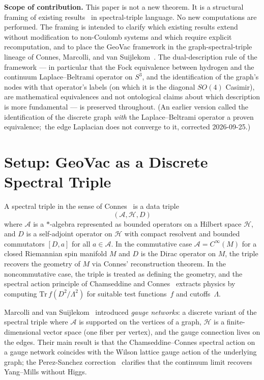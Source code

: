 \documentclass[twocolumn,pra,amsmath,amssymb,superscriptaddress]{revtex4-2}
\begin{document}
\medskip\noindent\textbf{Scope of contribution.}  This paper is not a
new theorem.  It is a structural framing of existing
results~\cite{paper22,paper23,paper24,paper30} in spectral-triple
language.  No new computations are performed.  The framing is
intended to clarify which existing results extend without
modification to non-Coulomb systems and which require explicit
recomputation, and to place the GeoVac framework in the
graph-spectral-triple lineage of Connes, Marcolli, and van
Suijlekom~\cite{connes_book1994,marcolli_vs2014,perez_sanchez2024}.
The dual-description rule of the framework --- in particular that the
Fock equivalence between hydrogen and the continuum Laplace--Beltrami
operator on $S^3$, and the identification of the graph's nodes with
that operator's labels (on which it is the diagonal $SO(4)$ Casimir),
are mathematical equivalences and not ontological claims about which
description is more fundamental --- is preserved throughout.  (An
earlier version called the identification of the discrete graph
\emph{with} the Laplace--Beltrami operator a proven equivalence;\ the
edge Laplacian does not converge to it, corrected 2026-09-25.)

\section{Setup: GeoVac as a Discrete Spectral Triple}
\label{sec:setup}

A spectral triple in the sense of Connes~\cite{connes_book1994} is a
data triple
\[
  (\mathcal{A}, \mathcal{H}, D)
\]
where $\mathcal{A}$ is a $*$-algebra represented as bounded
operators on a Hilbert space $\mathcal{H}$, and $D$ is a self-adjoint
operator on $\mathcal{H}$ with compact resolvent and bounded
commutators $[D, a]$ for all $a \in \mathcal{A}$.  In the commutative
case $\mathcal{A} = C^\infty(M)$ for a closed Riemannian spin manifold
$M$ and $D$ is the Dirac operator on $M$, the triple recovers the
geometry of $M$ via Connes' reconstruction theorem.  In the
noncommutative case, the triple is treated as defining the geometry,
and the spectral action principle of Chamseddine and
Connes~\cite{chamseddine_connes1997} extracts physics by computing
$\mathrm{Tr}\, f(D^2/\Lambda^2)$ for suitable test functions~$f$ and
cutoffs~$\Lambda$.

Marcolli and van Suijlekom~\cite{marcolli_vs2014} introduced
\emph{gauge networks}: a discrete variant of the spectral triple
where $\mathcal{A}$ is supported on the vertices of a graph,
$\mathcal{H}$ is a finite-dimensional vector space (one fiber per
vertex), and the gauge connection lives on the edges.  Their main
result is that the Chamseddine--Connes spectral action on a gauge
network coincides with the Wilson lattice gauge action of the
underlying graph; the Perez-Sanchez correction~\cite{perez_sanchez2025}
clarifies that the continuum limit recovers Yang--Mills without
Higgs.
\end{document}
